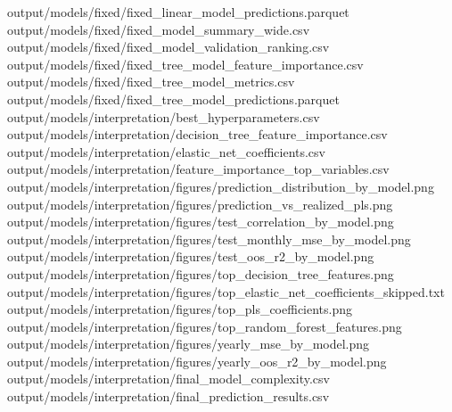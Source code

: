 \documentclass[
  11pt,
  a4paper]{article}
\newenvironment{Shaded}{}{}
\newcommand{\NormalTok}[1]{#1}
\begin{document}
\begin{Shaded}
\begin{Highlighting}[]
\NormalTok{output/models/fixed/fixed\_\allowbreak{}linear\_\allowbreak{}model\_\allowbreak{}predictions.parquet}
\NormalTok{output/models/fixed/fixed\_\allowbreak{}model\_\allowbreak{}summary\_\allowbreak{}wide.csv}
\NormalTok{output/models/fixed/fixed\_\allowbreak{}model\_\allowbreak{}validation\_\allowbreak{}ranking.csv}
\NormalTok{output/models/fixed/fixed\_\allowbreak{}tree\_\allowbreak{}model\_\allowbreak{}feature\_\allowbreak{}importance.csv}
\NormalTok{output/models/fixed/fixed\_\allowbreak{}tree\_\allowbreak{}model\_\allowbreak{}metrics.csv}
\NormalTok{output/models/fixed/fixed\_\allowbreak{}tree\_\allowbreak{}model\_\allowbreak{}predictions.parquet}
\NormalTok{output/models/interpretation/best\_\allowbreak{}hyperparameters.csv}
\NormalTok{output/models/interpretation/decision\_\allowbreak{}tree\_\allowbreak{}feature\_\allowbreak{}importance.csv}
\NormalTok{output/models/interpretation/elastic\_\allowbreak{}net\_\allowbreak{}coefficients.csv}
\NormalTok{output/models/interpretation/feature\_\allowbreak{}importance\_\allowbreak{}top\_\allowbreak{}variables.csv}
\NormalTok{output/models/interpretation/figures/prediction\_\allowbreak{}distribution\_\allowbreak{}by\_\allowbreak{}model.png}
\NormalTok{output/models/interpretation/figures/prediction\_\allowbreak{}vs\_\allowbreak{}realized\_\allowbreak{}pls.png}
\NormalTok{output/models/interpretation/figures/test\_\allowbreak{}correlation\_\allowbreak{}by\_\allowbreak{}model.png}
\NormalTok{output/models/interpretation/figures/test\_\allowbreak{}monthly\_\allowbreak{}mse\_\allowbreak{}by\_\allowbreak{}model.png}
\NormalTok{output/models/interpretation/figures/test\_\allowbreak{}oos\_\allowbreak{}r2\_\allowbreak{}by\_\allowbreak{}model.png}
\NormalTok{output/models/interpretation/figures/top\_\allowbreak{}decision\_\allowbreak{}tree\_\allowbreak{}features.png}
\NormalTok{output/models/interpretation/figures/top\_\allowbreak{}elastic\_\allowbreak{}net\_\allowbreak{}coefficients\_\allowbreak{}skipped.txt}
\NormalTok{output/models/interpretation/figures/top\_\allowbreak{}pls\_\allowbreak{}coefficients.png}
\NormalTok{output/models/interpretation/figures/top\_\allowbreak{}random\_\allowbreak{}forest\_\allowbreak{}features.png}
\NormalTok{output/models/interpretation/figures/yearly\_\allowbreak{}mse\_\allowbreak{}by\_\allowbreak{}model.png}
\NormalTok{output/models/interpretation/figures/yearly\_\allowbreak{}oos\_\allowbreak{}r2\_\allowbreak{}by\_\allowbreak{}model.png}
\NormalTok{output/models/interpretation/final\_\allowbreak{}model\_\allowbreak{}complexity.csv}
\NormalTok{output/models/interpretation/final\_\allowbreak{}prediction\_\allowbreak{}results.csv}

\end{Highlighting}
\end{Shaded}
\end{document}
